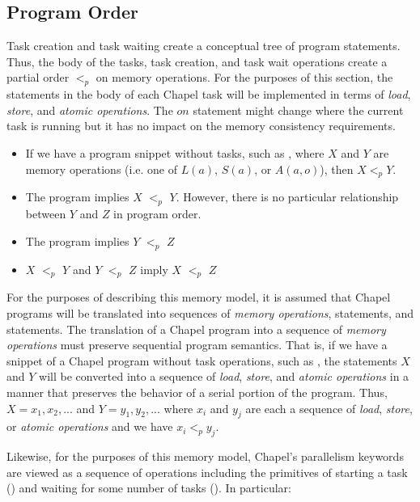 \subsection{Program Order}
\label{program_order}

Task creation and task waiting create a conceptual tree of program
statements. Thus, the body of the tasks, task creation, and task wait
operations create a partial order $<_p$ on memory operations.  
For the purposes of this section, the statements in the body of each
Chapel task will be implemented in terms of \textit{load}, \textit{store}, and
\textit{atomic operations}. The $on$ statement might change where the current
task is running but it has no impact on the memory consistency requirements.
\begin{itemize}
  \item If we have a program snippet without tasks, such as ,
  where $X$ and $Y$ are memory operations (i.e. one of $L(a)$, $S(a)$, or
  $A(a,o)$), then $X <_p Y$.

  \item The program  implies $X$ $<_p$ $Y$.
  However, there is no particular relationship between $Y$ and $Z$ in
  program order.

  \item The program  implies $Y$ $<_p$ $Z$

  \item $X$ $<_p$ $Y$ and $Y$ $<_p$ $Z$ imply $X$ $<_p$ $Z$

\end{itemize}

For the purposes of describing this memory model, it is assumed that Chapel
programs will be translated into sequences of \textit{memory operations},
 statements, and  statements. The translation of a
Chapel program into a sequence of \textit{memory operations} must preserve
sequential program semantics. That is, if we have a snippet of a Chapel program
without task operations, such as , the statements $X$ and $Y$ will
be converted into a sequence of \textit{load}, \textit{store}, and
\textit{atomic operations} in a manner that preserves the behavior of a serial
portion of the program. Thus, $X=x_1,x_2,...$ and $Y=y_1,y_2,...$ where $x_i$ and
$y_j$ are each a sequence of \textit{load}, \textit{store}, or \textit{atomic
operations} and we have $x_i <_p y_j$.

Likewise, for the purposes of this memory model, Chapel's parallelism keywords
are viewed as a sequence of operations including the primitives of starting a
task () and waiting for some number of tasks
(). In particular:


